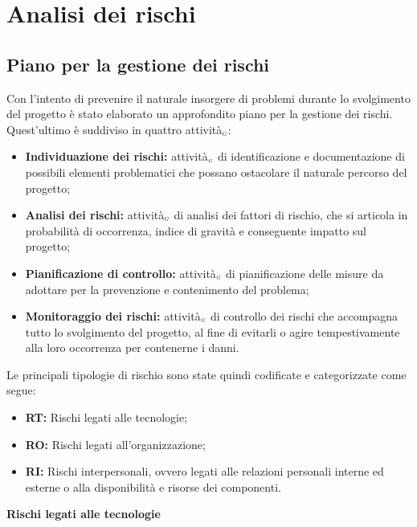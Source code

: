 \chapter{Analisi dei rischi}\label{AnalisiDeiRischi}

\section{Piano per la gestione dei rischi}\label{AnalisiDeiRischiPianoPerLaGestioneDeiRischi}
Con l'intento di prevenire il naturale insorgere di problemi durante lo svolgimento del progetto è stato elaborato un approfondito piano per la gestione dei rischi. Quest'ultimo è suddiviso in quattro attività$_{\scaleto{G}{3pt}}$:
\begin{itemize}
  \item \textbf{Individuazione dei rischi:} attività$_{\scaleto{G}{3pt}}$ di identificazione e documentazione di possibili elementi problematici che possano ostacolare il naturale percorso del progetto;
  \item \textbf{Analisi dei rischi:} attività$_{\scaleto{G}{3pt}}$ di analisi dei fattori di rischio, che si articola in probabilità di occorrenza, indice di gravità e conseguente impatto sul progetto;
  \item \textbf{Pianificazione di controllo:} attività$_{\scaleto{G}{3pt}}$ di pianificazione delle misure da adottare per la prevenzione e contenimento del problema;
  \item \textbf{Monitoraggio dei rischi:} attività$_{\scaleto{G}{3pt}}$ di controllo dei rischi che accompagna tutto lo svolgimento del progetto, al fine di evitarli o agire tempestivamente alla loro occorrenza per contenerne i danni.
\end{itemize}
Le principali tipologie di rischio sono state quindi codificate e categorizzate come segue:
\begin{itemize}
  \item \textbf{RT:} Rischi legati alle tecnologie;
  \item \textbf{RO:} Rischi legati all'organizzazione;
  \item \textbf{RI:} Rischi interpersonali, ovvero legati alle relazioni personali interne ed esterne o alla disponibilità e risorse dei componenti.
\end{itemize}

\quad
\begin{center}
	\LARGE\textbf{Rischi legati alle tecnologie}
\end{center}

